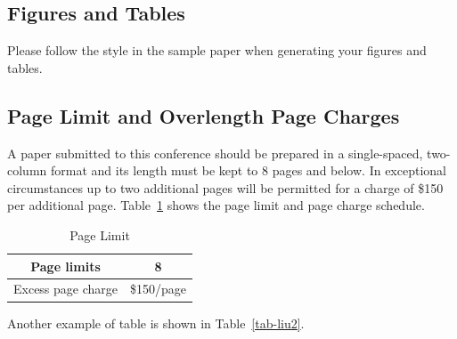 \documentclass[conference]{IEEEtran}
\begin{document}
\subsection{Figures and Tables}
Please follow the style in the sample paper when generating your figures and tables.

\def\del{
\subsection{What Sections to Include}
Usually, your paper should have Introduction, Main Results, Simulation Results, and
Conclusions. You may also add Acknowledgments if you like.
After that, you should have your References.}

\subsection{Page Limit and Overlength Page Charges}

A paper submitted to this conference should be prepared in a single-spaced, two-column 
format and its length must be kept to 8 pages and below.
In exceptional circumstances up to two additional pages will be
permitted for a charge of \$150 per additional page.
Table~\ref{table_example} shows the page limit
and page charge schedule.

%
\begin{table}
\begin{center}
\renewcommand{\arraystretch}{1.3}
\caption{Page Limit}
\label{table_example}
\begin{tabular}{|c|c|}
\hline
Page limits & 8\\
\hline
Excess page charge & \$150/page\\
\hline
\end{tabular}
\end{center}
\end{table}

Another example of table is shown in Table~\ref{tab-liu2}.
\end{document}
